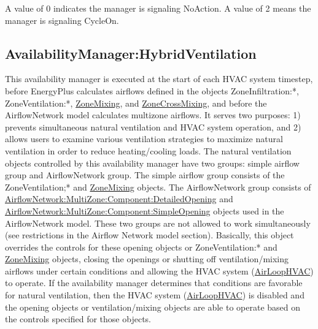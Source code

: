A value of 0 indicates the manager is signaling NoAction. A value of 2 means the manager is signaling CycleOn.

\subsection{AvailabilityManager:HybridVentilation}\label{availabilitymanagerhybridventilation}

This availability manager is executed at the start of each HVAC system timestep, before EnergyPlus calculates airflows defined in the objects ZoneInfiltration:*, ZoneVentilation:*, \hyperref[zonemixing]{ZoneMixing}, and \hyperref[zonecrossmixing]{ZoneCrossMixing}, and before the AirflowNetwork model calculates multizone airflows. It serves two purposes: 1) prevents simultaneous natural ventilation and HVAC system operation, and 2) allows users to examine various ventilation strategies to maximize natural ventilation in order to reduce heating/cooling loads. The natural ventilation objects controlled by this availability manager have two groups: simple airflow group and AirflowNetwork group. The simple airflow group consists of the ZoneVentilation;* and \hyperref[zonemixing]{ZoneMixing} objects. The AirflowNetwork group consists of \hyperref[airflownetworkmultizonecomponentdetailedopening]{AirflowNetwork:MultiZone:Component:DetailedOpening} and \hyperref[airflownetworkmultizonecomponentsimpleopening]{AirflowNetwork:MultiZone:Component:SimpleOpening} objects used in the AirflowNetwork model. These two groups are not allowed to work simultaneously (see restrictions in the Airflow Network model section). Basically, this object overrides the controls for these opening objects or ZoneVentilation:* and \hyperref[zonemixing]{ZoneMixing} objects, closing the openings or shutting off ventilation/mixing airflows under certain conditions and allowing the HVAC system (\hyperref[airloophvac]{AirLoopHVAC}) to operate. If the availability manager determines that conditions are favorable for natural ventilation, then the HVAC system (\hyperref[airloophvac]{AirLoopHVAC}) is disabled and the opening objects or ventilation/mixing objects are able to operate based on the controls specified for those objects.

